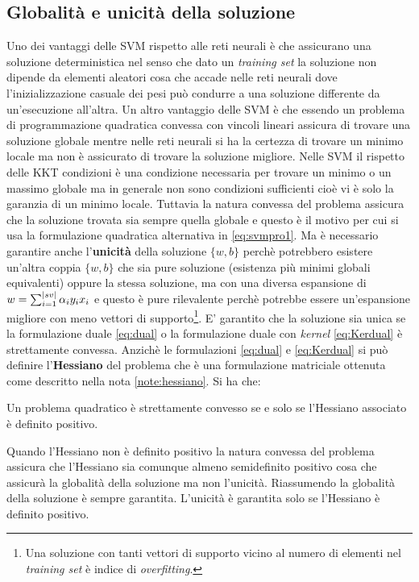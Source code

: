 \subsection{Globalità e unicità della soluzione}
Uno dei vantaggi delle \ac{SVM} rispetto alle reti neurali è che assicurano una soluzione deterministica nel senso che dato un \textit{training set} la soluzione non dipende da elementi aleatori cosa che accade nelle reti neurali dove l'inizializzazione casuale dei pesi può condurre a una soluzione differente da un'esecuzione all'altra. Un altro vantaggio delle \ac{SVM} è che essendo un problema di programmazione quadratica convessa con vincoli lineari assicura di trovare una soluzione globale mentre nelle reti neurali si ha la certezza di trovare un minimo locale ma non è assicurato di trovare la soluzione migliore. Nelle \ac{SVM} il rispetto delle  KKT condizioni è una condizione necessaria per trovare un minimo o un massimo globale ma in generale non sono condizioni sufficienti cioè vi è solo la garanzia di un minimo locale. Tuttavia la natura convessa del problema assicura che la soluzione trovata sia sempre quella globale e questo è il motivo per cui si usa la formulazione quadratica alternativa in \ref{eq:svmpro1}. Ma è necessario garantire anche l'\textbf{unicità} della soluzione $\{w,b\}$ perchè potrebbero esistere un'altra coppia $\{w,b\}$ che sia pure soluzione (esistenza più minimi globali equivalenti) oppure la stessa soluzione, ma con una diversa espansione di $w=\sum_{i=1}^{\lvert sv\rvert}\alpha_iy_ix_i$ e questo è pure rilevalente perchè potrebbe essere un'espansione migliore con meno vettori di supporto\footnote{Una soluzione con tanti vettori di supporto vicino al numero di elementi nel \textit{training set} è indice di \textit{overfitting}.}.
E' garantito che la soluzione sia unica se la formulazione duale \ref{eq:dual} o la formulazione duale con \textit{kernel} \ref{eq:Kerdual} è strettamente convessa. Anzichè le formulazioni \ref{eq:dual} e \ref{eq:Kerdual} si può definire l'\textbf{Hessiano} del problema che è una formulazione matriciale ottenuta come descritto nella nota \ref{note:hessiano}. Si ha che:
\begin{teorema*} Un problema quadratico è strettamente convesso se e solo se l'Hessiano associato è definito positivo.
\end{teorema*}
Quando l'Hessiano non è definito positivo la natura convessa del problema assicura che l'Hessiano sia comunque  almeno semidefinito positivo cosa che assicurà la globalità della soluzione ma non l'unicità.  Riassumendo la globalità della soluzione è sempre garantita. L'unicità è garantita solo se l'Hessiano è definito positivo. 